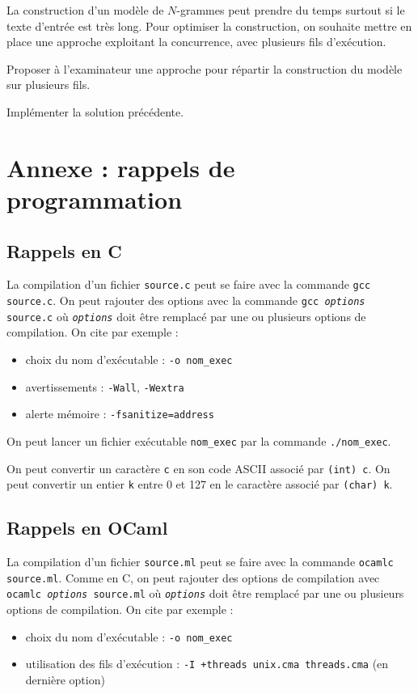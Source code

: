 \documentclass[10pt]{article}
\begin{document}
La construction d'un modèle de $N$-grammes peut prendre du temps surtout si le texte d'entrée est très long. Pour optimiser la construction, on souhaite mettre en place une approche exploitant la concurrence, avec plusieurs fils d'exécution.

\begin{Exercise}
Proposer à l'examinateur une approche pour répartir la construction du modèle sur plusieurs fils.
\end{Exercise}

\begin{Exercise}
Implémenter la solution précédente.
\end{Exercise}
\section*{Annexe : rappels de programmation}
\subsection*{Rappels en C}
La compilation d'un fichier \verb"source.c" peut se faire avec la commande \verb"gcc source.c". On peut rajouter des options avec la commande \texttt{gcc \textit{options} source.c} où \texttt{\textit{options}} doit être remplacé par une ou plusieurs options de compilation. On cite par exemple :
\begin{itemize}
\item choix du nom d'exécutable : \verb"-o nom_exec"
\item avertissements : \verb"-Wall", \verb"-Wextra"
\item alerte mémoire : \verb"-fsanitize=address"
\end{itemize}

On peut lancer un fichier exécutable \verb"nom_exec" par la commande \verb"./nom_exec".

On peut convertir un caractère \verb"c" en son code ASCII associé par \verb"(int) c". On peut convertir un entier \verb"k" entre 0 et 127 en le caractère associé par \verb"(char) k".
\subsection*{Rappels en OCaml}

La compilation d'un fichier \verb"source.ml" peut se faire avec la commande \verb"ocamlc source.ml". Comme en C, on peut rajouter des options de compilation avec \texttt{ocamlc \textit{options} source.ml} où \texttt{\textit{options}} doit être remplacé par une ou plusieurs options de compilation. On cite par exemple :
\begin{itemize}
\item choix du nom d'exécutable : \verb"-o nom_exec"
\item utilisation des fils d'exécution : \verb"-I +threads unix.cma threads.cma" (en dernière option)\\
\end{itemize}
\end{document}
